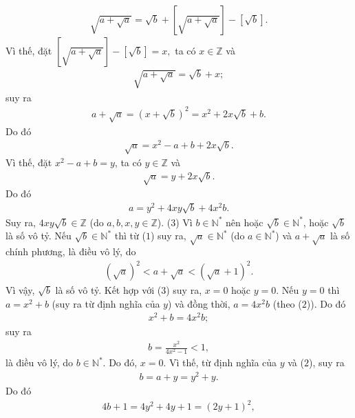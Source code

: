 \begin{multicols}{2}
\begin{align*}
		\sqrt {a + \sqrt a }  = \sqrt b  + \left[ {\sqrt {a + \sqrt a } } \right] - \left[ {\sqrt b } \right].
	\end{align*}
	Vì thế, đặt $\left[ {\sqrt {a + \sqrt a } } \right] - \left[ {\sqrt b } \right] = x,$  ta có $x \in \mathbb{Z}$ và
	\begin{align*}
		\sqrt {a + \sqrt a }  = \sqrt b  + x;
	\end{align*}
	suy ra
	\begin{align*}
		a \!+\! \sqrt a  \!=\! {\left( {x \!+\! \sqrt b } \right)^2} \!=\! {x^2} \!+\! 2x\sqrt b  \!+\! b. \tag{$1$}
	\end{align*}
	Do đó
	\begin{align*}
		\sqrt a  = {x^2} - a + b + 2x\sqrt b .
	\end{align*}
	Vì thế, đặt ${x^2} - a + b = y$,  ta có  $y \in \mathbb{Z}$ và
	\begin{align*}
		\sqrt a  = y + 2x\sqrt b .
	\end{align*}
	Do đó
	\begin{align*}
		a = {y^2} + 4xy\sqrt b  + 4{x^2}b. \tag{$2$}
	\end{align*}
	Suy ra, $4xy\sqrt{b} \in \mathbb{Z}$ (do $a, b, x, y \in \mathbb{Z}$). \hfill ($3$)
	\vskip 0.05cm
	Vì $b \in \mathbb{N^*}$  nên hoặc $\sqrt{b} \in \mathbb{N^*}$,  hoặc $\sqrt{b}$  là số vô tỷ.
	\vskip 0.05cm
	Nếu $\sqrt{b} \in \mathbb{N^*}$ thì từ ($1$) suy ra, $\sqrt{a} \in \mathbb{N^*}$  (do  $a \in \mathbb{N^*}$) và $a + \sqrt{a}$  là số chính phương, là điều vô lý, do
	\begin{align*}
		{\left( {\sqrt a } \right)^2} < a + \sqrt a  < {\left( {\sqrt a  + 1} \right)^2}.
	\end{align*}
	Vì vậy, $\sqrt{b}$  là số vô tỷ. Kết hợp với ($3$) suy ra, $x = 0$ hoặc $y = 0$.
	\vskip 0.05cm
	Nếu $y = 0$ thì $a = x^2 + b$  (suy ra từ định nghĩa của $y$) và đồng thời, $a = 4x^2b$  (theo ($2$)). Do đó
	\begin{align*}
		{x^2} + b = 4{x^2}b;
	\end{align*}
	suy ra
	\begin{align*}
		b = \frac{{{x^2}}}{{4{x^2} - 1}} < 1,
	\end{align*}
	là điều vô lý, do $b \in \mathbb{N^*}$.
	\vskip 0.05cm 
	Do đó, $x = 0$. Vì thế, từ định nghĩa của $y$ và ($2$), suy ra
	\begin{align*}
		b = a + y = {y^2} + y.
	\end{align*}
	Do đó
	\begin{align*}
		4b + 1 = 4{y^2} + 4y + 1 = {\left( {2y + 1} \right)^2},

\end{align*}
\end{multicols}
